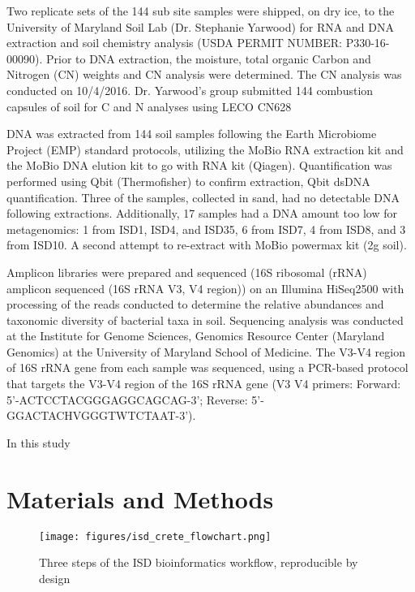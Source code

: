 Two replicate sets of the 144 sub site samples were shipped, on dry ice, to the
University of Maryland Soil Lab (Dr. Stephanie Yarwood) for RNA and DNA extraction
and soil chemistry analysis (USDA PERMIT NUMBER: P330-16-00090).
Prior to DNA extraction, the moisture, total organic Carbon and Nitrogen (CN) weights
and CN analysis were determined. The CN analysis was conducted on 10/4/2016.
Dr. Yarwood’s group submitted 144 combustion capsules of soil for C and N analyses using LECO CN628 

DNA was extracted from 144 soil samples following the Earth Microbiome Project (EMP)
standard protocols, utilizing the MoBio RNA extraction kit and the  MoBio DNA elution kit to go with RNA kit (Qiagen).
Quantification was performed using Qbit (Thermofisher) to confirm extraction, Qbit dsDNA
quantification. Three of the samples, collected in sand, had no detectable DNA
following extractions. Additionally, 17 samples had a DNA amount too low for metagenomics: 1 from ISD1, ISD4, and ISD35, 6 from ISD7, 4 from ISD8, and 3 from ISD10. A second attempt to re-extract with MoBio powermax kit (2g soil). 

Amplicon libraries were prepared and sequenced (16S ribosomal (rRNA) amplicon
sequenced (16S rRNA V3, V4 region)) on an Illumina HiSeq2500 with processing of
the reads conducted to determine the relative abundances and taxonomic diversity of bacterial taxa in soil.
Sequencing analysis was conducted at the Institute for Genome Sciences, Genomics
Resource Center (Maryland Genomics) at the University of Maryland School of Medicine.
The V3-V4 region of 16S rRNA gene from each sample was sequenced, using a
PCR-based protocol that targets the V3-V4 region of the 16S rRNA gene (V3 V4 primers: Forward: 5'-ACTCCTACGGGAGGCAGCAG-3'; Reverse: 5'-GGACTACHVGGGTWTCTAAT-3').

In this study




\section{Materials and Methods}\label{methods}

   \begin{figure}[h]
      \centering
      \texttt{[image: figures/isd\_crete\_flowchart.png]}
      \caption[Reproducible workflow of ISD analysis]{Three steps of the ISD bioinformatics workflow, reproducible by design}
      \label{fig:isd_workflow_taxonomy}
   \end{figure}
   
